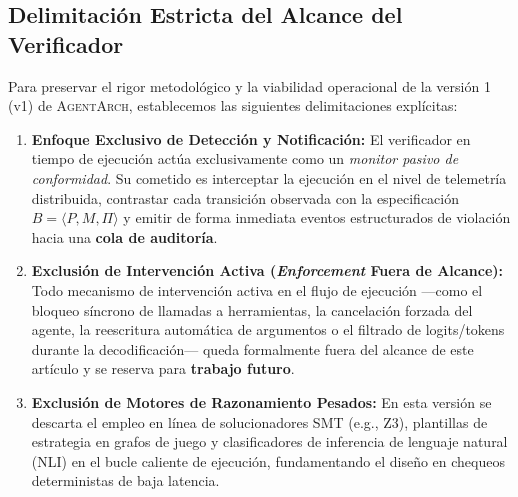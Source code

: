 \documentclass[conference]{IEEEtran}
\begin{document}
\subsection{Delimitaci\'on Estricta del Alcance del Verificador}
Para preservar el rigor metodol\'ogico y la viabilidad operacional de la versi\'on 1 (v1) de \textsc{AgentArch}, establecemos las siguientes delimitaciones expl\'icitas:
\begin{enumerate}
    \item \textbf{Enfoque Exclusivo de Detecci\'on y Notificaci\'on:} El verificador en tiempo de ejecuci\'on act\'ua exclusivamente como un \emph{monitor pasivo de conformidad}. Su cometido es interceptar la ejecuci\'on en el nivel de telemetr\'ia distribuida, contrastar cada transici\'on observada con la especificaci\'on $B = \langle P, M, \Pi \rangle$ y emitir de forma inmediata eventos estructurados de violaci\'on hacia una \textbf{cola de auditor\'ia}.
    \item \textbf{Exclusi\'on de Intervenci\'on Activa (\emph{Enforcement} Fuera de Alcance):} Todo mecanismo de intervenci\'on activa en el flujo de ejecuci\'on ---como el bloqueo s\'incrono de llamadas a herramientas, la cancelaci\'on forzada del agente, la reescritura autom\'atica de argumentos o el filtrado de logits/tokens durante la decodificaci\'on--- queda formalmente fuera del alcance de este art\'iculo y se reserva para \textbf{trabajo futuro}.
    \item \textbf{Exclusi\'on de Motores de Razonamiento Pesados:} En esta versi\'on se descarta el empleo en l\'inea de solucionadores SMT (e.g., Z3), plantillas de estrategia en grafos de juego y clasificadores de inferencia de lenguaje natural (NLI) en el bucle caliente de ejecuci\'on, fundamentando el dise\~no en chequeos deterministas de baja latencia.
\end{enumerate}
\end{document}

